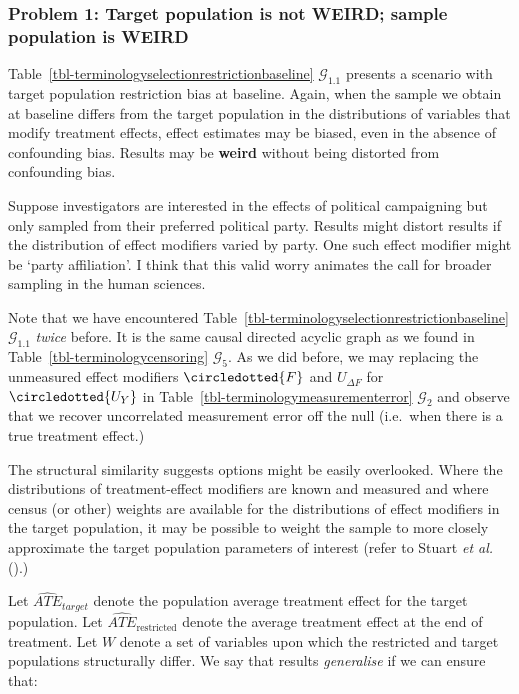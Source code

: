 \documentclass[
  single column]{article}
\begin{document}
\subsubsection{Problem 1: Target population is not WEIRD; sample
population is
WEIRD}\label{problem-1-target-population-is-not-weird-sample-population-is-weird}

Table~\ref{tbl-terminologyselectionrestrictionbaseline}
\(\mathcal{G}_{1.1}\) presents a scenario with target population
restriction bias at baseline. Again, when the sample we obtain at
baseline differs from the target population in the distributions of
variables that modify treatment effects, effect estimates may be biased,
even in the absence of confounding bias. Results may be \textbf{weird}
without being distorted from confounding bias.

Suppose investigators are interested in the effects of political
campaigning but only sampled from their preferred political party.
Results might distort results if the distribution of effect modifiers
varied by party. One such effect modifier might be `party affiliation'.
I think that this valid worry animates the call for broader sampling in
the human sciences.

Note that we have encountered
Table~\ref{tbl-terminologyselectionrestrictionbaseline}
\(\mathcal{G}_{1.1}\) \emph{twice} before. It is the same causal
directed acyclic graph as we found in
Table~\ref{tbl-terminologycensoring} \(\mathcal{G}_5\). As we did
before, we may replacing the unmeasured effect modifiers
\(\circledotted{F}\) and \(U_{\Delta F}\) for \(\circledotted{U_Y}\) in
Table~\ref{tbl-terminologymeasurementerror} \(\mathcal{G}_2\) and
observe that we recover uncorrelated measurement error off the null
(i.e.~when there is a true treatment effect.)

The structural similarity suggests options might be easily overlooked.
Where the distributions of treatment-effect modifiers are known and
measured and where census (or other) weights are available for the
distributions of effect modifiers in the target population, it may be
possible to weight the sample to more closely approximate the target
population parameters of interest (refer to Stuart \emph{et al.}
().)

Let \(\widehat{ATE}_{target}\) denote the population average treatment
effect for the target population. Let
\(\widehat{ATE}_{\text{restricted}}\) denote the average treatment
effect at the end of treatment. Let \(W\) denote a set of variables upon
which the restricted and target populations structurally differ. We say
that results \emph{generalise} if we can ensure that:
\end{document}

